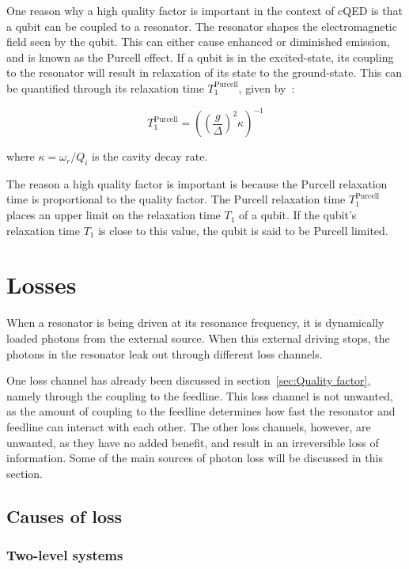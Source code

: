     One reason why a high quality factor is important in the context of cQED is that a qubit can be coupled to a resonator. The resonator shapes the electromagnetic field seen by the qubit. This can either cause enhanced or diminished emission, and is known as the Purcell effect. If a qubit is in the excited-state, its coupling to the resonator will result in relaxation of its state to the ground-state. This can be quantified through its relaxation time $T_1^\text{Purcell}$, given by~\cite{Reed}:

    \begin{equation}
      T_1^\text{Purcell} = \left(\left(\frac{g}{\Delta}\right)^2\kappa\right)^{-1}
      \label{eq:purcell T1}
    \end{equation}

    where $\kappa=\omega_r/Q_i$ is the cavity decay rate.

     The reason a high quality factor is important is because the Purcell relaxation time is proportional to the quality factor. The Purcell relaxation time $T_1^\text{Purcell}$ places an upper limit on the relaxation time $T_1$ of a qubit. If the qubit's relaxation time $T_1$ is close to this value, the qubit is said to be Purcell limited.

  \section{Losses}
    \label{sec:Losses}

      When a resonator is being driven at its resonance frequency, it is dynamically loaded photons from the external source. When this external driving stops, the photons in the resonator leak out through different loss channels.

      One loss channel has already been discussed in section~\ref{sec:Quality factor}, namely through the coupling to the feedline. This loss channel is not unwanted, as the amount of coupling to the feedline determines how fast the resonator and feedline can interact with each other. The other loss channels, however, are unwanted, as they have no added benefit, and result in an irreversible loss of information. Some of the main sources of photon loss will be discussed in this section.

  \subsection{Causes of loss}

    \subsubsection{Two-level systems}
      \label{sec:TLS}

